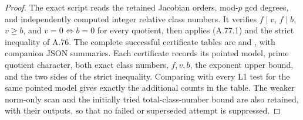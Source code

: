 \documentclass[11pt]{article}
\begin{document}
\begin{proof}
The exact script 
reads the retained Jacobian orders, mod-$p$ gcd degrees,
and independently computed integer relative class numbers.
It verifies $f\mid v$, $f\mid b$, $v\ge b$, and
$v=0\Longleftrightarrow b=0$ for every quotient,
then applies (A.77.1) and the strict inequality of A.76.
The complete successful certificate tables are
and
,
with companion JSON summaries. Each certificate records
its pointed model, prime quotient character, both exact
class numbers, $f,v,b$, the exponent upper bound,
and the two sides of the strict inequality. Comparing
with every L1 test for the same pointed model gives
exactly the additional counts in the table. The weaker
norm-only scan and the initially tried total-class-number
bound are also retained, with their outputs, so that no
failed or superseded attempt is suppressed.
\end{proof}
\end{document}
